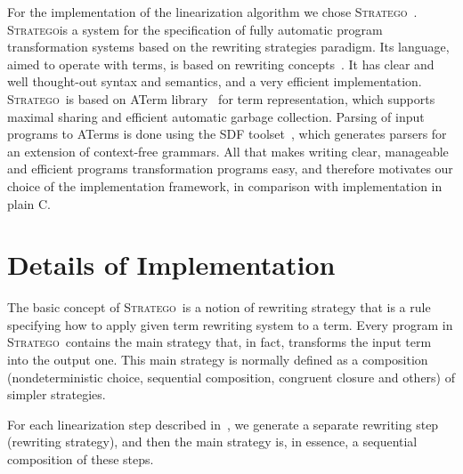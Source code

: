 \documentclass{article}
\newcommand{\stratego}{\textsc{Stratego}}
\begin{document}
For the implementation of the linearization algorithm we chose
\stratego~\cite{Vis01}. \stratego is a system for the specification of
fully automatic program transformation systems based on the rewriting
strategies paradigm. Its language, aimed to operate with terms, is
based on rewriting concepts~\cite{BN99}. It has clear and well
thought-out syntax and semantics, and a very efficient implementation.
\stratego\ is based on ATerm library~\cite{BJKO00} for term
representation, which supports maximal sharing and efficient automatic
garbage collection. Parsing of input programs to ATerms is done using
the SDF toolset~\cite{Vis97}, which generates parsers for an extension
of context-free grammars. All that makes writing clear, manageable and
efficient programs transformation programs easy, and therefore
motivates our choice of the implementation framework, in comparison
with implementation in plain C.

\section{Details of Implementation}
The basic concept of \stratego\ is a notion of rewriting strategy that
is a rule specifying how to apply given term rewriting system to a
term. Every program in \stratego\ contains the main strategy that, in
fact, transforms the input term into the output one.  This main
strategy is normally defined as a composition (nondeterministic
choice, sequential composition, congruent closure and others) of
simpler strategies.

For each linearization step described in~\cite{Use02}, we generate a
separate rewriting step (rewriting strategy), and then the main
strategy is, in essence, a sequential composition of these steps.
\end{document}
